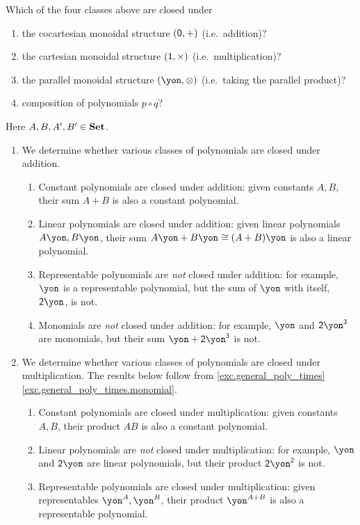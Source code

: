 \documentclass[Book-Poly]{subfiles}
\begin{document}
\begin{exercise}
Which of the four classes above are closed under
\begin{enumerate}
	\item the cocartesian monoidal structure $(\textsf{0},+)$ (i.e.\ addition)?
	\item the cartesian monoidal structure $(\textsf{1},\times)$ (i.e.\ multiplication)?
	\item the parallel monoidal structure $(\yon,\otimes)$ (i.e.\ taking the parallel product)?
	\item composition of polynomials $p\circ q$?
\qedhere
\end{enumerate}
\begin{solution}
Here $A, B, A', B' \in \mathbf{Set}$.
\begin{enumerate}
    \item We determine whether various classes of polynomials are closed under addition.
    \begin{enumerate}
        \item Constant polynomials are closed under addition: given constants $A, B$, their sum $A + B$ is also a constant polynomial.
        \item Linear polynomials are closed under addition: given linear polynomials $A\yon, B\yon$, their sum $A\yon + B\yon \iso (A + B)\yon$ is also a linear polynomial.
        \item Representable polynomials are \emph{not} closed under addition: for example, $\yon$ is a representable polynomial, but the sum of $\yon$ with itself, $\2\yon$, is not.
        \item Monomials are \emph{not} closed under addition: for example, $\yon$ and $\2\yon^\3$ are monomials, but their sum $\yon + \2\yon^\3$ is not.
    \end{enumerate}
    \item We determine whether various classes of polynomials are closed under multiplication.
    The results below follow from \cref{exc.general_poly_times} \cref{exc.general_poly_times.monomial}.
    \begin{enumerate}
        \item Constant polynomials are closed under multiplication: given constants $A, B$, their product $AB$ is also a constant polynomial.
        \item Linear polynomials are \emph{not} closed under multiplication: for example, $\yon$ and $\2\yon$ are linear polynomials, but their product $\2\yon^\2$ is not.
        \item Representable polynomials are closed under multiplication: given representables $\yon^A, \yon^B$, their product $\yon^{A+B}$ is also a representable polynomial.

\end{enumerate}
\end{enumerate}
\end{solution}
\end{exercise}
\end{document}

